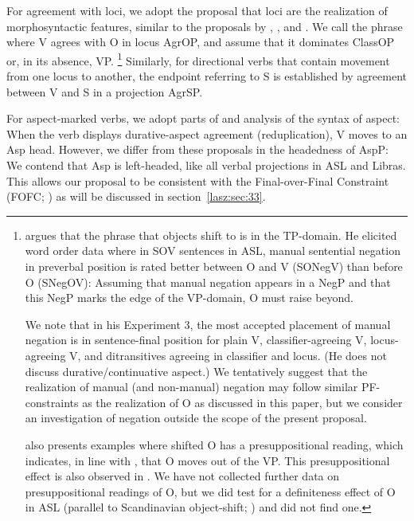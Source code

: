 \documentclass[output=paper]{langscibook}
\begin{document}
For agreement with loci, we adopt the proposal that loci are the
realization of morphosyntactic features, similar to the proposals by
\citet{Neidle.etal.2000}, \citet{Kuhn.2016}, and \citet{Pfau.etal.2018}. We call the
phrase where V agrees with O in locus AgrOP, and assume that it
dominates ClassOP or, in its absence, VP.%
\footnote{
    \citet{Gokgoz.2013} argues that the phrase that objects shift to is in the
    TP-domain. He elicited word order data where in SOV sentences in ASL, manual
    sentential negation in preverbal position is rated better between O and V (SONegV)
    than before O (SNegOV): Assuming that manual negation appears in a NegP and
    that this NegP marks the edge of the VP-domain, O must raise beyond.
    
    We note that in his Experiment 3, the most accepted placement of manual
    negation is in sentence-final position for plain V, classifier-agreeing V,
    locus-agreeing V, and ditransitives agreeing in classifier and locus. (He does not
    discuss durative/continuative aspect.) We tentatively suggest that the realization of
    manual (and non-manual) negation may follow similar PF-constraints as the
    realization of O as discussed in this paper, but we consider an investigation of
    negation outside the scope of the present proposal.
    
    \citeauthor{Gokgoz.2013} also presents examples where shifted O has a presuppositional
    reading, which indicates, in line with \citet{Diesing1992}, that O moves out of the VP.
    This presuppositional effect is also observed in \citet{Napoli.SS.RMQ.2017}. We have not
    collected further data on presuppositional readings of O, but we did test for a
    definiteness effect of O in ASL (parallel to Scandinavian object-shift; \citealp{Holmberg:1986})
    and did not find one.
}
Similarly, for
directional verbs that contain movement from one locus to another, the
endpoint referring to S is established by agreement between V and S
in a projection AgrSP.

For aspect-marked verbs, we adopt parts of 
and  analysis of the syntax of aspect: When the verb
displays durative-aspect agreement (reduplication), V moves to an Asp
head. However, we differ from these proposals in the headedness of
AspP: We contend that Asp is left-headed, like all verbal projections in
ASL and Libras. This allows our proposal to be consistent with the
Final-over-Final Constraint (FOFC; \citealp{BiberauerHR.2014,SheehanBRH.2017}) 
as will be discussed in section~\ref{lasz:sec:33}.
\end{document}
